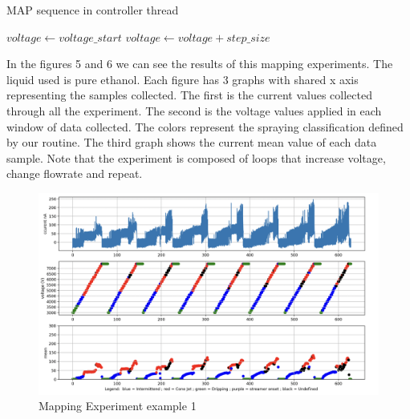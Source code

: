     \begin{algorithm}
        \caption{MAP sequence in controller thread}\label{alg:mapping_algorithm}
        \begin{algorithmic}
              
                \State {}
                \State $voltage \gets voltage\_start$
                 
                    \State {}
                    \State {}
                    \State $voltage \gets voltage + step\_size$
                \EndWhile
            \EndFor
        \EndProcedure

        \end{algorithmic}
    \end{algorithm}

    In the figures 5 and 6 we can see the results of this mapping experiments. The liquid used is pure ethanol. 
    Each figure has 3 graphs with shared x axis representing the samples collected. The first is the current values collected through all the experiment.
    The second is the voltage values applied in each window of data collected. The colors represent the spraying classification defined by our routine.
    The third graph shows the current mean value of each data sample.
    Note that the experiment is composed of loops that increase voltage, change flowrate and repeat.


    \begin{figure}[H]
        \center
        \includegraphics[width=15cm]{Figuras/report2/map2Data.png}
        \caption{Mapping Experiment example 1}
        \label{fig:map2Data_fig}
    \end{figure}


